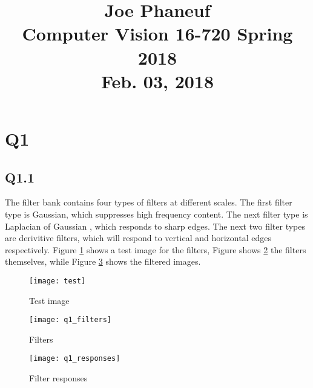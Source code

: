 \documentclass[12pt]{article}
\begin{document}
\title{Joe Phaneuf \\ Computer Vision 16-720 Spring 2018 \\ Feb. 03, 2018 }
\date{}
\author{}
\maketitle

\newpage


\section{Q1}
\subsection{Q1.1}

The filter bank contains four types of filters at different scales. The first filter type is Gaussian, which suppresses high frequency content. The next filter type is Laplacian of Gaussian , which responds to sharp edges. The next two filter types are derivitive filters, which will respond to vertical and horizontal edges respectively.
Figure \ref{fig:test_image} shows a test image for the filters, Figure shows \ref{fig:filters} the filters themselves, while Figure \ref{fig:filter_responses} shows the filtered images.

\begin{figure}[H]
\centering
\texttt{[image: test]}
\caption{Test image}    
\label{fig:test_image}
\end{figure}   

\begin{figure}[H]
\centering
\texttt{[image: q1\_filters]}
\caption{Filters}    
\label{fig:filters}
\end{figure}   

\begin{figure}[H]
\centering
\texttt{[image: q1\_responses]}
\caption{Filter responses}    
\label{fig:filter_responses}
\end{figure}   

\newpage
\end{document}
